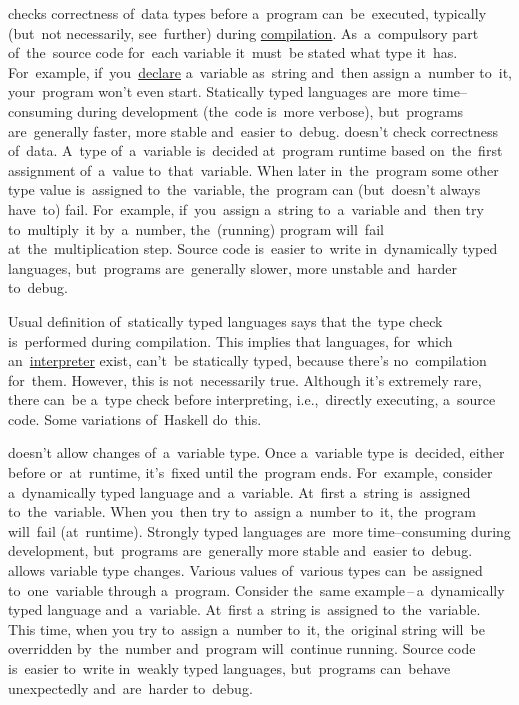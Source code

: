 \begin{itemize}
     checks correctness of~data types before a~program can~be~executed, typically (but~not necessarily, see~further) during \hyperref[compiledinterpretedlanguages]{compilation}.
            As~a~compulsory part of~the~source code for~each variable it~must~be stated what type it~has.
            For~example, if~you~\hyperref[declarationdefinition]{declare} a~variable as~string and~then assign a~number to~it, your~program won't even start.
            Statically typed languages are~more time--consuming during development (the~code is~more verbose), but~programs are~generally faster, more stable and~easier to~debug.
     doesn't check correctness of~data.
            A~type of~a~variable is~decided at~program runtime based on~the~first assignment of~a~value to~that~variable.
            When later in~the~program some other type value is~assigned to~the~variable, the~program can (but~doesn't always have~to) fail.
            For~example, if~you~assign a~string to~a~variable and~then try to~multiply~it by~a~number, the~(running) program will~fail at~the~multiplication step.
            Source code is~easier to~write in~dynamically typed languages, but~programs are~generally slower, more unstable and~harder to~debug.
\end{itemize}

\warning Usual definition of~statically typed languages says that the~type check is~performed during compilation.
This implies that languages, for~which an~\hyperref[compiledinterpretedlanguages]{interpreter} exist, can't~be statically typed, because there's no~compilation for~them.
However, this is not~necessarily true.
Although it's extremely rare, there can~be a~type check before interpreting, i.e.,~directly executing, a~source code.
Some variations of~Haskell do~this.

\begin{itemize}
     doesn't allow changes of~a~variable type.
            Once a~variable type is~decided, either before or~at~runtime, it's~fixed until the~program ends.
            For~example, consider a~dynamically typed language and~a~variable.
            At~first a~string is~assigned to~the~variable.
            When you~then try to~assign a~number to~it, the~program will~fail (at~runtime).
            Strongly typed languages are~more time--consuming during development, but~programs are~generally more stable and~easier to~debug.
     allows variable type changes.
            Various values of~various types can~be assigned to~one~variable through a~program.
            Consider the~same example\,--\,a~dynamically typed language and~a~variable.
            At~first a~string is~assigned to~the~variable.
            This time, when you try to~assign a~number to~it, the~original string will~be overridden by~the~number and~program will~continue running.
            Source code is~easier to~write in~weakly typed languages, but~programs can~behave unexpectedly and~are~harder to~debug.
\end{itemize}


